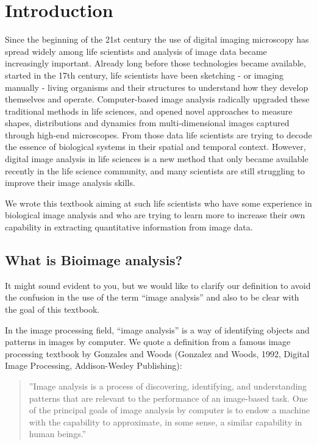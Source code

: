 \section{Introduction}\label{introduction}


Since the beginning of the 21st century the use of digital imaging microscopy has spread widely among life scientists and analysis of image data became increasingly important. Already long before those technologies became available, started in the 17th century, life scientists have been sketching - or imaging manually - living organisms and their structures to understand how they develop themselves and operate.
Computer-based image analysis radically upgraded these
traditional methods in life sciences, and opened novel approaches to measure shapes, distributions and dynamics from multi-dimensional images captured through high-end microscopes. From those data life scientists are trying to
decode the essence of biological systems in their spatial and temporal context. However, digital image analysis in life sciences is a new method that only became available recently in the life science community, and many scientists are still struggling to improve their image analysis skills. 

We wrote this textbook aiming at such life scientists who have some
experience in biological image analysis and who are trying to learn more to
increase their own capability in extracting quantitative information
from image data.

\subsection{What is Bioimage analysis?}\label{what-is-bioimage-analysis}

It might sound evident to you, but we would like
to clarify our definition to avoid the confusion in the use of the term
``image analysis'' and also to be clear with the goal of this textbook.

In the image processing field, ``image analysis'' is a way of
identifying objects and patterns in images by computer. We quote a definition from
a famous image processing textbook by Gonzales and Woods (Gonzalez and Woods,
1992, Digital Image Processing, Addison-Wesley Publishing):

\begin{quote}
''Image analysis is a process of discovering, identifying, and
understanding patterns that are relevant to the performance of an
image-based task. One of the principal goals of image analysis by
computer is to endow a machine with the capability to approximate, in
some sense, a similar capability in human beings.'' 
\end{quote}

